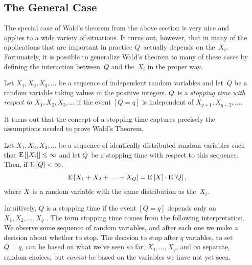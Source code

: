 \documentclass[11pt,twoside]{article}
\begin{document}
\subsection{The General Case}

The special case of Wald's theorem from the above section is very nice
and applies to a wide variety of situations. It turns out, however,
that in many of the applications that are important in practice
$Q$~actually depends on the~$X_i$. Fortunately, it is possible to
generalize Wald's theorem to many of these cases by defining the
interaction between~$Q$ and the~$X_i$ in the proper way.
\begin{definition}
  Let $X_1, X_2, X_3, \ldots$ be a sequence of independent random
  variables and let~$Q$ be a random variable taking values in the
  positive integers. $Q$~is a \emph{stopping time with respect to
    $X_1, X_2, X_3, \ldots$} if the event $[Q = q]$ is independent
  of $X_{q+1}, X_{q+2}, \ldots$.
\end{definition}
It turns out that the concept of a stopping time captures precisely
the assumptions needed to prove Wald's Theorem.
\begin{theorem}
  Let $X_1, X_2, X_3, \ldots$ be a sequence of identically distributed
  random variables such that $\mathop{\textup{E}}\nolimits\left[\left|X_i\right|\right] \leq \infty$ and let $Q$~be a
  stopping time with respect to this sequence. Then, if $\mathop{\textup{E}}\nolimits\left[Q\right] <
  \infty$,
  \begin{displaymath}
    \mathop{\textup{E}}\nolimits\left[X_1 + X_2 + \ldots + X_Q\right] = \mathop{\textup{E}}\nolimits\left[X\right] \cdot \mathop{\textup{E}}\nolimits\left[Q\right],
  \end{displaymath}
  where $X$~is a random variable with the same distribution as
  the~$X_i$.
\end{theorem}
Intuitively, $Q$ is a stopping time if the event $[Q = q]$ depends
only on $X_1, X_2, \ldots, X_q$ . The term stopping time comes from
the following interpretation. We observe some sequence of random
variables, and after each one we make a decision about whether to
stop.  The decision to stop after $q$ variables, \ie to set $Q=q$,
can be based on what we've seen so far, \ie $X_1,\ldots,X_q$, and on
separate, random choices, but \emph{cannot} be based on the variables
we have not yet seen.
\end{document}
